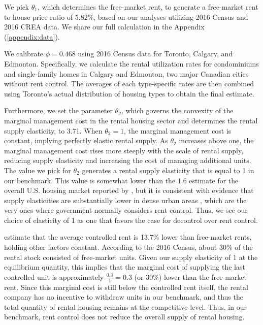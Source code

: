 \documentclass[parskip=full]{article}
\begin{document}
We pick $\theta_1$, which determines the free-market rent, to generate a free-market rent to house price ratio of 5.82\%, based on our analyses utilizing 2016 Census and 2016 CREA data. We share our full calculation in the Appendix (\ref{appendix:data}).

We calibrate $\phi=0.468$ using 2016 Census data for Toronto, Calgary, and Edmonton. Specifically, we calculate the rental utilization rates for condominiums and single-family homes in Calgary and Edmonton, two major Canadian cities without rent control. The averages of each type-specific rates are then combined using Toronto’s actual distribution of housing types to obtain the final estimate. 

Furthermore, we set the parameter $\theta_2$, which governs the convexity of the marginal management cost in the rental housing sector and determines the rental supply elasticity, to 3.71. When $\theta_2=1$, the marginal management cost is constant, implying perfectly elastic rental supply. As $\theta_2$ increases above one, the marginal management cost rises more steeply with the scale of rental supply, reducing supply elasticity and increasing the cost of managing additional units. The value we pick for $\theta_2$ generates a rental supply elasticity that is equal to 1 in our benchmark. This value is somewhat lower than the 1.6 estimate for the overall U.S. housing market reported by \citet{rs-2023}, but it is consistent with evidence that supply elasticities are substantially lower in dense urban areas \citep{cy-1994,susin-2002,fack-2006,sy-2020}, which are the very ones where government normally considers rent control. Thus, we see our choice of elasticity of 1 as one that favors the case for decontrol over rent control.

\citet{zhang-gou} estimate that the average controlled rent is 13.7\% lower than free-market rents, holding other factors constant. According to the 2016 Census, about 30\% of the rental stock consisted of free-market units. Given our supply elasticity of 1 at the equilibrium quantity, this implies that the marginal cost of supplying the last controlled unit is approximately $\frac{0.3}{1}=0.3$ (or 30\%) lower than the free-market rent. Since this marginal cost is still below the controlled rent itself, the rental company has no incentive to withdraw units in our benchmark, and thus the total quantity of rental housing remains at the competitive level. Thus, in our benchmark, rent control does not reduce the overall supply of rental housing.
\end{document}

